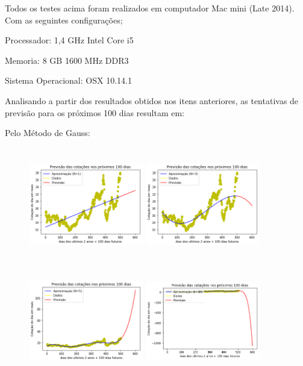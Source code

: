 \documentclass{article}
\begin{document}
\text Todos os testes acima foram realizados em computador Mac mini (Late 2014).
Com as seguintes configurações;
\item Processador: 1,4 GHz Intel Core i5
\item Memoria: 8 GB 1600 MHz DDR3
\item Sistema Operacional: OSX 10.14.1

\newpage 
Analisando a partir dos resultados obtidos nos itens anteriores, as tentativas de previsão para os próximos 100 dias resultam em:

\item Pelo Método de Gauss:
\begin{figure}[!htb]
\includegraphics [width=5cm,height=5cm]{Previsao (usando Gauss)/P1.png}
\includegraphics [width=5cm,height=5cm]{Previsao (usando Gauss)/P3.png}
\includegraphics [width=5cm,height=5cm]{Previsao (usando Gauss)/P5.png}
\includegraphics [width=5cm,height=5cm]{Previsao (usando Gauss)/P10.png}

\end{figure}
\end{document}
